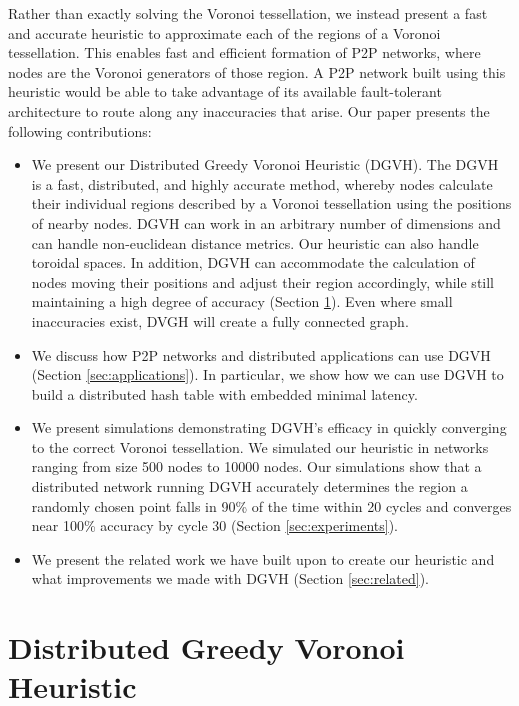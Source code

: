 Rather than exactly solving the Voronoi tessellation, we instead present a fast and accurate heuristic to approximate each of the regions of a Voronoi tessellation.
This enables fast and efficient formation of P2P networks, where nodes are the Voronoi generators of those region.
A P2P network built using this heuristic would be able to take advantage of its available fault-tolerant architecture to route along any inaccuracies that arise.
Our paper presents the following contributions:
\begin{itemize}
	\item We present our Distributed Greedy Voronoi Heuristic (DGVH). 
	The DGVH is a fast, distributed, and highly accurate method, whereby nodes calculate their individual regions described by a Voronoi tessellation using the positions of nearby nodes.
	DGVH can work in an arbitrary number of dimensions and can handle non-euclidean distance metrics.
    Our heuristic can also handle toroidal spaces.
	In addition, DGVH can accommodate the calculation of nodes moving their positions and adjust their region accordingly, while still maintaining a high degree of accuracy (Section \ref{sec:dgvh}).
    Even where small inaccuracies exist, DVGH will create a fully connected graph.
	\item We discuss how P2P networks and distributed applications can use DGVH (Section \ref{sec:applications}).
	In particular, we show how we can use DGVH to build a distributed hash table with embedded minimal latency.
	\item We present simulations demonstrating DGVH's efficacy in quickly converging to the correct Voronoi tessellation.
    We simulated our heuristic in networks ranging from size 500 nodes to 10000 nodes.
	Our simulations show that a distributed network running DGVH accurately determines the region a randomly chosen point falls in 90\% of the time within 20 cycles and converges near 100\% accuracy by cycle 30 (Section \ref{sec:experiments}).
	\item We present the related work we have built upon to create our heuristic and what improvements we made with DGVH (Section \ref{sec:related}).
\end{itemize}


\section{Distributed Greedy Voronoi Heuristic}
\label{sec:dgvh}



